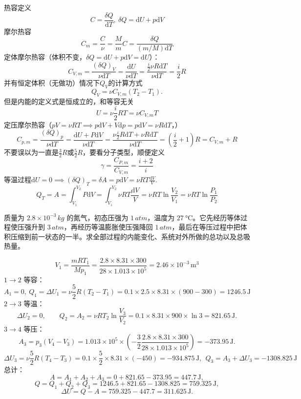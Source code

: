 \documentclass[lang=cn,11pt]{elegantbook}
\begin{document}
\begin{definition}[热容]
    热容定义\[C=\frac{\delta Q}{\mathrm dT},~\delta Q=\mathrm dU+p\mathrm dV\]
    摩尔热容\[C_m=\frac{C}{\nu}=\frac{M}{m}C=\frac{\delta Q}{(m/M)\mathrm dT}\]
    定体摩尔热容（体积不变，$\delta Q=\mathrm dU+p\mathrm dV=\mathrm dU$）：\[C_{V,m}=\frac{(\delta Q)_V}{\nu\mathrm dT}=\frac{\mathrm dU}{\nu\mathrm dT}=\frac{\frac{i}{2}\nu R\mathrm dT}{\nu\mathrm dT}=\frac{i}{2}R\]
    并有恒定体积（无做功）情况下$Q_V$的计算方式\[Q_V=\nu C_{V,m}(T_2-T_1).\]但是内能的定义式是恒成立的，和等容无关\[U=\nu\frac{i}{2}RT=\nu C_{V,m}T\]
    定压摩尔热容（$pV=\nu RT\implies p\mathrm dV+V\mathrm dp=p\mathrm dV=\nu R\mathrm dT$，）
    \[C_{p,m}=\frac{(\delta Q)_p}{\nu\mathrm dT}=\frac{\mathrm dU+P\mathrm dV}{\nu\mathrm dT}=\frac{\nu\frac{i}{2}R\mathrm dT+\nu R\mathrm dT}{\nu\mathrm dT}=\left(\frac{i}{2}+1\right)R=C_{V,m}+R\]
    不要误以为一直是$\frac{3}{2}R$或$\frac{5}{2}R$，要看分子类型，顺便定义\[\gamma=\frac{C_{P,m}}{C_{V,m}}=\frac{i+2}{i}\]
    等温过程\(\mathrm dU=0\implies(\delta Q)_T=\delta A=p\mathrm dV=\nu RT\frac{\mathrm{d}V}{V}.\)
    \[Q_T=A=\int_{V_1}^{V_2}P\mathrm dV=\int_{V_1}^{V_2}\nu RT\frac{\mathrm{d}V}{V}=\nu RT\ln\frac{V_2}{V_1}=\nu RT\ln\frac{P_1}{P_2}\]
\end{definition} 

\begin{exercise}
质量为 \(2.8\times10^{-3}\,\si{kg}\) 的氮气，初态压强为 \(1\,\si{atm}\)，温度为 \(\SI{27}{\celsius}\)。它先经历等体过程使压强升到 \(3\,\si{atm}\)，再经历等温膨胀使压强降回 \(1\,\si{atm}\)，最后在等压过程中把体积压缩到前一状态的一半。求全部过程的内能变化、系统对外所做的总功以及总吸热量。
\end{exercise}
\begin{solution}
\[V_1=\frac{mRT_1}{Mp_1}=\frac{2.8\times 8.31\times 300}{28\times 1.013\times 10^5}=2.46\times10^{-3}\,\text{m}^3\]
\(1\to2\) 等容：
\[
A_1=0,~ Q_1=\Delta U_1=\nu\frac{5}{2}R(T_2-T_1)=0.1\times 2.5\times 8.31\times (900-300)=1246.5\,\text{J}
\]
\(2\to3\) 等温：
\[
\Delta U_2=0,\qquad Q_2=A_2=\nu RT_2\ln\frac{V_3}{V_2}=0.1\times 8.31\times 900\times \ln3=821.65\,\text{J}.
\]
\(3\to4\) 等压：
\[A_3=p_3(V_4-V_3)=1.013\times 10^5\times \left(-\frac32\frac{2.8\times 8.31\times 300}{28\times 1.013\times 10^5}\right)=-373.95\,\text{J}.\]
\[\Delta U_3=\nu\frac{5}{2}R(T_4-T_3)=0.1\times\frac52\times 8.31\times(-450)=-934.875\,\text{J},~~Q_3=A_3+\Delta U_3=-1308.825\,\text{J}\]
总计：
\[
A=A_1+A_2+A_3=0+821.65-373.95=447.7\,\text{J},
\]\[
Q=Q_1+Q_2+Q_3=1246.5+821.65-1308.825=759.325\,\text{J},
\]\[
\Delta U=Q-A=759.325-447.7=311.625\,\text{J}.
\]
\end{solution}
\end{document}
